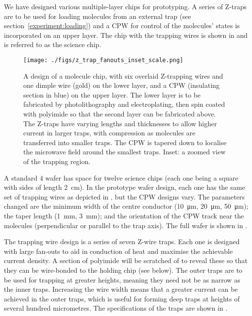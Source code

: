 We have designed various multiple-layer chips for prototyping. A series of
Z-traps are to be used for loading molecules from an external trap (see
section~\ref{experiment:loading}) and a CPW for control of the molecules' states
is incorporated on an upper layer. The chip with the trapping wires is shown in
 and is referred to as the science chip.

\begin{figure}[tph]
  \texttt{[image: ./figs/z\_trap\_fanouts\_inset\_scale.png]}
  \caption{
    A design of a molecule chip, with six overlaid Z-trapping wires and one
    dimple wire (gold) on the lower layer, and a CPW (insulating section in
    blue) on the upper layer.  The lower layer is to be fabricated by
    photolithography and electroplating, then spin coated with polyimide so that
    the second layer can be fabricated above. The Z-traps have varying lengths
    and thicknesses to allow higher current in larger traps, with compression as
    molecules are transferred into smaller traps. The CPW is tapered down to
    localise the microwave field around the smallest traps. Inset: a zoomed view
    of the trapping region.
  }
  \label{experiment:fig:chipdesign}
\end{figure}

A standard \SI{4}{\inch} wafer has space for twelve science chips (each one being
a square with sides of length \SI{2}{\centi\metre}). In the prototype wafer
design, each one has the same set of trapping wires as depicted in
, but the CPW designs vary. The parameters
changed are the minimum width of the centre conductor (\SI{10}{\micro\metre},
\SI{20}{\micro\metre}, \SI{50}{\micro\metre}); the taper length
(\SI{1}{\milli\metre}, \SI{3}{\milli\metre}); and the orientation of the CPW
track near the molecules (perpendicular or parallel to the trap axis). The full
wafer is shown in .

The trapping wire design is a series of seven Z-wire traps. Each one is designed
with large fan-outs to aid in conduction of heat and maximise the achievable
current density. A section of polyimide will be scratched of to reveal these so
that they can be wire-bonded to the holding chip (see below). The outer traps
are to be used for trapping at greater heights, meaning they need not be as
narrow as the inner traps. Increasing the wire width means that a greater
current can be achieved in the outer traps, which is useful for forming deep
traps at heights of several hundred micrometres. The specifications of the traps
are shown in .


